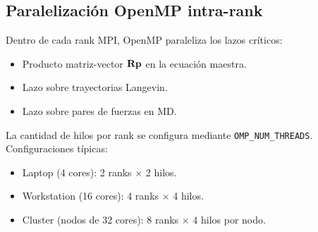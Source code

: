 \subsection{Paralelización OpenMP intra-rank}

Dentro de cada rank MPI, OpenMP paraleliza los lazos críticos:
\begin{itemize}
\item Producto matriz-vector $\vb{R} \vb{p}$ en la ecuación maestra.
\item Lazo sobre trayectorias Langevin.
\item Lazo sobre pares de fuerzas en MD.
\end{itemize}
%
La cantidad de hilos por rank se configura mediante 
\texttt{OMP\_NUM\_THREADS}. Configuraciones típicas:
\begin{itemize}
\item Laptop (4 cores): 2 ranks $\times$ 2 hilos.
\item Workstation (16 cores): 4 ranks $\times$ 4 hilos.
\item Cluster (nodos de 32 cores): 8 ranks $\times$ 4 hilos por nodo.
\end{itemize}
